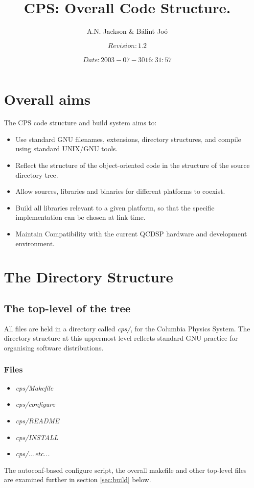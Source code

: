 \documentclass[12pt]{article}
\title{CPS: Overall Code Structure.}
\author{A.N. Jackson \& B\'{a}lint Jo\'{o}}
\date{\mbox{\small $$Revision: 1.2 $$  $$Date: 2003-07-30 16:31:57 $$}}
\begin{document}
\maketitle

\tableofcontents
\newpage

\section{Overall aims}
The CPS code structure and build system aims to:
\begin{itemize}
\setlength{\itemsep}{0.0cm}
 \item Use standard GNU filenames, extensions, directory structures, and
 compile using standard UNIX/GNU tools.
 \item Reflect the structure of the object-oriented code in the structure of
 the source directory tree.
 \item Allow sources, libraries and binaries for different platforms to coexist.
 \item Build all libraries relevant to a given platform, so that the specific
 implementation can be chosen at link time.
\item Maintain Compatibility with the current QCDSP hardware and development environment.
\end{itemize}

\section{The Directory Structure}
\label{sec:dirs}

\subsection{The top-level of the tree}
All files are held in a directory called \emph{cps/}, for the Columbia Physics System.
The directory structure at this uppermost level reflects standard GNU practice
for organising software distributions.

\subsubsection{Files}
\begin{itemize}
\setlength{\itemsep}{0.0cm}
 \item \emph{cps/Makefile}
 \item \emph{cps/configure}
 \item \emph{cps/README}
 \item \emph{cps/INSTALL}
 \item \emph{cps/...etc...}
\end{itemize}
The autoconf-based configure script, the overall makefile and other top-level 
files are examined further in section \ref{sec:build} below.
\end{document}
